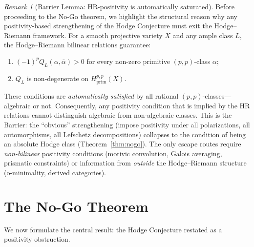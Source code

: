\documentclass[aps,prd,twocolumn,superscriptaddress,nofootinbib]{revtex4-2}
\theoremstyle{definition}
\theoremstyle{remark}
\newtheorem{remark}[theorem]{Remark}
\begin{document}
\begin{remark}[Barrier Lemma: HR-positivity is automatically saturated]
\label{rem:barrier-lemma}
Before proceeding to the No-Go theorem, we highlight the structural reason why any positivity-based strengthening of the Hodge Conjecture must exit the Hodge--Riemann framework. For a smooth projective variety $X$ and any ample class $L$, the Hodge--Riemann bilinear relations guarantee:
\begin{enumerate}
\item $(-1)^p Q_L(\alpha, \bar{\alpha}) > 0$ for every non-zero primitive $(p,p)$-class $\alpha$;
\item $Q_L$ is non-degenerate on $H^{p,p}_{\mathrm{prim}}(X)$.
\end{enumerate}
These conditions are \emph{automatically satisfied} by all rational $(p,p)$-classes---algebraic or not. Consequently, any positivity condition that is implied by the HR relations cannot distinguish algebraic from non-algebraic classes. This is the Barrier: the ``obvious'' strengthening (impose positivity under all polarizations, all automorphisms, all Lefschetz decompositions) collapses to the condition of being an absolute Hodge class (Theorem~\ref{thm:nogo}). The only escape routes require \emph{non-bilinear} positivity conditions (motivic convolution, Galois averaging, prismatic constraints) or information from \emph{outside} the Hodge--Riemann structure (o-minimality, derived categories).
\end{remark}

\section{The No-Go Theorem}
\label{sec:nogo}

We now formulate the central result: the Hodge Conjecture restated as a positivity obstruction.
\end{document}
